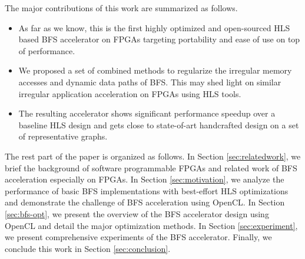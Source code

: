 The major contributions of this work are summarized as follows.
\begin{itemize}
    \item As far as we know, this is the first highly optimized and open-sourced 
		HLS based BFS accelerator on FPGAs targeting portability and ease of 
		use on top of performance. 
    \item We proposed a set of combined methods to regularize the irregular
		memory accesses and dynamic data paths of BFS. This may shed light on similar 
		irregular application acceleration on FPGAs using HLS tools.
    \item The resulting accelerator shows significant performance speedup 
        over a baseline HLS design and gets close to state-of-art handcrafted 
		design on a set of representative graphs.
\end{itemize}

The rest part of the paper is organized as follows. In Section \ref{sec:relatedwork}, 
we brief the background of software programmable FPGAs and related work of 
BFS acceleration especially on FPGAs. In Section \ref{sec:motivation},  
we analyze the performance of basic BFS implementations with best-effort HLS 
optimizations and demonstrate the challenge of BFS acceleration using OpenCL. 
In Section \ref{sec:bfs-opt}, we present the overview of the BFS accelerator 
design using OpenCL and detail the major optimization methods.
In Section \ref{sec:experiment}, we present comprehensive experiments of the 
BFS accelerator. Finally, we conclude this work in Section \ref{sec:conclusion}.


